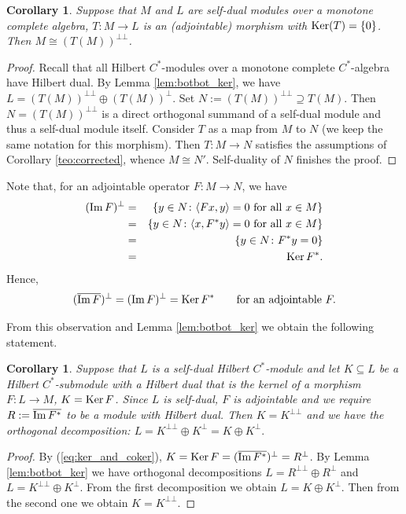 \documentclass[12pt]{amsart}
\newtheorem{cor}[teo]{Corollary}
\newcommand{\Ker}{\operatorname{Ker}}
\def\<{\langle}
\def\>{\rangle}
\def\Ker{\mathop{\rm Ker}\nolimits}
\def\Im{\mathop{\rm Im}\nolimits}
\begin{document}
\begin{cor}\label{cor:self_du}
	Suppose that $M$ and $L$ are self-dual modules over a monotone complete
algebra, $T:M\to L$ is 
	an (adjointable) morphism with $\Ker(T)=\{0\}$. Then $M\cong (T(M))^{\bot\bot}$. 
\end{cor}	

\begin{proof}
Recall that all Hilbert $C^*$-modules over a monotone complete $C^*$-algebra have Hilbert dual. By Lemma \ref{lem:botbot_ker}, we have $L= (T(M))^{\bot\bot} \oplus (T(M))^{\bot}$. Set $N:= (T(M))^{\bot\bot}\supseteq T(M)$. Then $N= (T(M))^{\bot\bot}$ is a direct orthogonal summand of a self-dual module and thus a self-dual module itself. Consider $T$ as a map from $M$ to $N$ (we keep the same notation for this morphism). Then $T:M\to N$ satisfies the assumptions of Corollary \ref{teo:corrected}, whence $M\cong N'$. Self-duality of $N$ finishes the proof.
\end{proof}	

	Note that, for an adjointable operator $F:M\to N$, we have
	\begin{eqnarray*}
(\Im F)^{\bot}&=&\{y \in N \colon \<Fx,y\>=0 \mbox{ for all } x\in M\}\\
&=&
\{y \in N \colon \<x,F^*y\>=0 \mbox{ for all } x\in M\}\\
&=&\{y \in N \colon F^*y=0 \}\\
&=&\Ker F^*.
	\end{eqnarray*}
Hence,
\begin{equation}\label{eq:ker_and_coker}
(\overline{ \Im F})^{\bot}=(\Im F)^{\bot}=\Ker F^*\qquad\mbox{for an adjointable }F.
\end{equation}

From this observation and Lemma \ref{lem:botbot_ker} we obtain the following statement.

\begin{cor}\label{cor:K_botbot=K}
Suppose that $L$ is a self-dual Hilbert $C^*$-module and let $K\subseteq L$ be a Hilbert $C^*$-submodule with a Hilbert dual that is the kernel of a morphism $F:L\to M$, $K=\Ker F$. 
Since $L$ is self-dual, $F$ is adjointable and we require $R:=\overline{ \Im F^*}$ to be a module with Hilbert
dual.
Then $K=K^{\bot\bot}$ and we have the orthogonal decomposition:
$
L=K^{\bot\bot}\oplus K^\bot=K\oplus K^\bot.
$ 
\end{cor}

\begin{proof}
 By (\ref{eq:ker_and_coker}),   
$K=\Ker F = (\overline{ \Im F^*})^\bot=R^\bot$. By Lemma \ref{lem:botbot_ker} we have
orthogonal decompositions
$L=R^{\bot\bot} \oplus R^\bot$ and $L=K^{\bot\bot} \oplus K^\bot$. 
From the first decomposition we obtain $L=K\oplus K^\bot$. Then from the second one we obtain $K=
K^{\bot\bot}$.
\end{proof}
\end{document}
